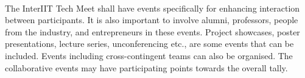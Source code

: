 
\paragraph{}
The InterIIT Tech Meet shall have events specifically for enhancing interaction between participants. It is also important to involve alumni, professors, people from the industry, and entrepreneurs in these events. Project showcases, poster presentations, lecture series, unconferencing etc., are some events that can be included. Events including cross-contingent teams can also be organised. The collaborative events may have participating points towards the overall tally.